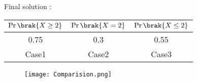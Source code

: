\documentclass[journal,12pt,twocolumn]{IEEEtran}
\begin{document}
  Final solution :  
  
    \begin{center}
  
  \begin{tabular}{|c|c|c|}
    \hline
    $\Pr\brak{X \geq 2}$ &  $\Pr \brak{X = 2}$ & $\Pr\brak{X \leq 2}$\\
    \hline
     0.75& 0.3& 0.55 \\
    \hline
    Case1 &Case2 &Case3\\
    \hline
\end{tabular} 
\end{center}

\begin{figure}
    \centering
    \texttt{[image: Comparision.png]}
    
\end{figure}
\end{document}
